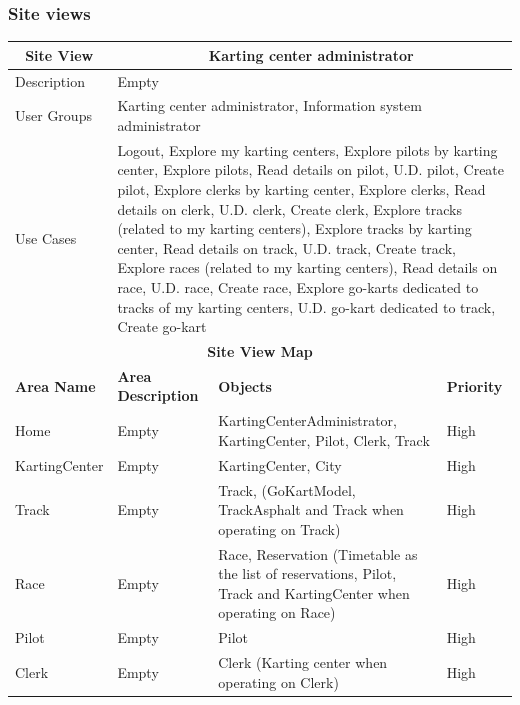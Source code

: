 \documentclass{beamer}
\begin{document}
\begin{frame}
    \frametitle{Site views}
    \begin{table}
        \centering
        \tiny
        \setlength{\tabcolsep}{1pt}
        \begin{tabular}{|m{2cm}|m{4cm}|m{3cm}|m{1cm}|}
        \hline
        \multicolumn{1}{|c|}{\textbf{Site View}} & \multicolumn{3}{c|}{\textbf{Karting center administrator}} \\
        \hline
        Description & \multicolumn{3}{m{8cm}|}{Empty} \\
        \hline
        User Groups & \multicolumn{3}{m{8cm}|}{Karting center administrator, Information system administrator} \\
        \hline
        Use Cases & \multicolumn{3}{m{8cm}|}{Logout, Explore my karting centers, 
        Explore pilots by karting center, Explore pilots, Read details on pilot, U.D. pilot, 
        Create pilot, Explore clerks by karting center, Explore clerks, Read details on clerk, 
        U.D. clerk, Create clerk, Explore tracks (related to my karting centers), 
        Explore tracks by karting center, Read details on track, U.D. track, 
        Create track, Explore races (related to my karting centers), Read details on race, 
        U.D. race, Create race, Explore go-karts dedicated to tracks of my karting centers, 
        U.D. go-kart dedicated to track, Create go-kart} \\
        \hline
        \multicolumn{4}{|c|}{\textbf{Site View Map}} \\
        \hline
        \textbf{Area Name} & \textbf{Area Description} & \textbf{Objects} & \textbf{Priority} \\
        \hline
        Home & Empty & KartingCenterAdministrator, KartingCenter, Pilot, Clerk, Track & High \\
        \hline
        KartingCenter & Empty & KartingCenter, City & High \\
        \hline
        Track & Empty & Track, (GoKartModel, TrackAsphalt and
        Track when operating on Track) & High \\
        \hline
        Race & Empty & Race, Reservation (Timetable as the list of reservations, 
        Pilot, Track and KartingCenter when operating on Race) & High \\
        \hline
        Pilot & Empty & Pilot & High \\
        \hline
        Clerk & Empty & Clerk (Karting center when operating on Clerk) & High \\
        \hline
        \end{tabular}
    \end{table}
\end{frame}
\end{document}
